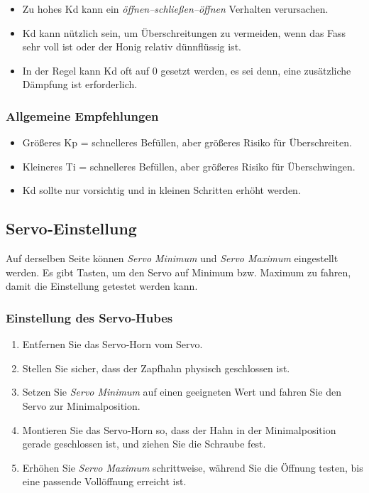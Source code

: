 \documentclass[11pt,a4paper]{article}
\begin{document}
\begin{itemize}[leftmargin=*]
    \item Zu hohes Kd kann ein \textit{öffnen–schließen–öffnen} Verhalten verursachen.
    \item Kd kann nützlich sein, um Überschreitungen zu vermeiden, wenn das Fass sehr voll ist oder der Honig relativ dünnflüssig ist.
    \item In der Regel kann Kd oft auf 0 gesetzt werden, es sei denn, eine zusätzliche Dämpfung ist erforderlich.
\end{itemize}

\subsubsection*{Allgemeine Empfehlungen}

\begin{itemize}[leftmargin=*]
    \item Größeres Kp = schnelleres Befüllen, aber größeres Risiko für Überschreiten.
    \item Kleineres Ti = schnelleres Befüllen, aber größeres Risiko für Überschwingen.
    \item Kd sollte nur vorsichtig und in kleinen Schritten erhöht werden.
\end{itemize}

\subsection{Servo‑Einstellung}

Auf derselben Seite können \textit{Servo Minimum} und \textit{Servo Maximum} eingestellt werden. Es gibt Tasten, um den Servo auf Minimum bzw. Maximum zu fahren, damit die Einstellung getestet werden kann.

\subsubsection*{Einstellung des Servo‑Hubes}

\begin{enumerate}[leftmargin=*]
    \item Entfernen Sie das Servo‑Horn vom Servo.
    \item Stellen Sie sicher, dass der Zapfhahn physisch geschlossen ist.
    \item Setzen Sie \textit{Servo Minimum} auf einen geeigneten Wert und fahren Sie den Servo zur Minimalposition.
    \item Montieren Sie das Servo‑Horn so, dass der Hahn in der Minimalposition gerade geschlossen ist, und ziehen Sie die Schraube fest.
    \item Erhöhen Sie \textit{Servo Maximum} schrittweise, während Sie die Öffnung testen, bis eine passende Vollöffnung erreicht ist.
\end{enumerate}
\end{document}
